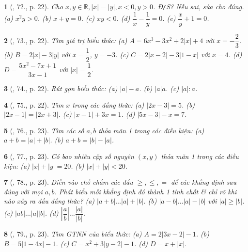 \documentclass{article}
\newtheorem{baitoan}{}
\begin{document}
\begin{baitoan}[\cite{Binh_Toan_7_tap_1}, 72., p. 22]
	Cho $x,y\in\mathbb{R},|x| = |y|,x < 0,y > 0$. {\rm Đ{\tt/}S?} Nếu sai, sửa cho đúng. (a) $x^2y > 0$. (b) $x + y = 0$. (c) $xy < 0$. (d) $\dfrac{1}{x} - \dfrac{1}{y} = 0$. (e) $\dfrac{x}{y} + 1 = 0$.	
\end{baitoan}

\begin{baitoan}[\cite{Binh_Toan_7_tap_1}, 73., p. 22]
	Tìm giá trị biểu thức: (a) $A = 6x^3 - 3x^2 + 2|x| + 4$ với $x = -\dfrac{2}{3}$. (b) $B = 2|x| - 3|y|$ với $x = \dfrac{1}{2}$, $y = -3$. (c) $C = 2|x - 2| - 3|1 - x|$ với $x = 4$. (d) $D = \dfrac{5x^2 - 7x + 1}{3x - 1}$ với $|x| = \dfrac{1}{2}$.	
\end{baitoan}

\begin{baitoan}[\cite{Binh_Toan_7_tap_1}, 74., p. 22]
	Rút gọn biểu thức: (a) $|a| - a$. (b) $|a|a$. (c) $|a|:a$.	
\end{baitoan}

\begin{baitoan}[\cite{Binh_Toan_7_tap_1}, 75., p. 22]
	Tìm $x$ trong các đẳng thức: (a) $|2x - 3| = 5$. (b) $|2x - 1| = |2x + 3|$. (c) $|x - 1| + 3x = 1$. (d) $|5x - 3| - x = 7$.	
\end{baitoan}

\begin{baitoan}[\cite{Binh_Toan_7_tap_1}, 76., p. 23]
	Tìm các số $a,b$ thỏa mãn 1 trong các điều kiện: (a) $a + b = |a| + |b|$. (b) $a + b = |b| - |a|$.	
\end{baitoan}

\begin{baitoan}[\cite{Binh_Toan_7_tap_1}, 77., p. 23]
	Có bao nhiêu cặp số nguyên $(x,y)$ thỏa mãn 1 trong các điều kiện: (a) $|x| + |y| = 20$. (b) $|x| + |y| < 20$.	
\end{baitoan}

\begin{baitoan}[\cite{Binh_Toan_7_tap_1}, 78., p. 23]
	Điền vào chỗ chấm các dấu $\ge,\le,=$ để các khẳng định sau đúng với mọi $a,b$. Phát biểu mỗi khẳng định đó thành 1 tính chất \& chỉ rõ khi nào xảy ra dấu đẳng thức? (a) $|a + b|\ldots|a| + |b|$. (b) $|a - b|\ldots|a| - |b|$ với $|a|\ge|b|$. (c) $|ab|\ldots|a||b|$. (d) $\left|\dfrac{a}{b}\right|\ldots\dfrac{|a|}{|b|}$.	
\end{baitoan}

\begin{baitoan}[\cite{Binh_Toan_7_tap_1}, 79., p. 23]
	Tìm {\rm GTNN} của biểu thức: (a) $A = 2|3x - 2| - 1$. (b) $B = 5|1 - 4x| - 1$. (c) $C = x^2 + 3|y - 2| - 1$. (d) $D = x + |x|$.	
\end{baitoan}
\end{document}
